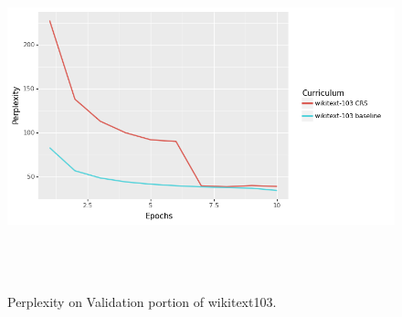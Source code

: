 \begin{figure}[h]
\centering
\includegraphics[width=15cm, height=10cm]{Thesis/images/wikitext-103BS.png}
\caption{Perplexity on Validation portion of wikitext103.}
\label{fig:cs-perp-103}
\end{figure}
